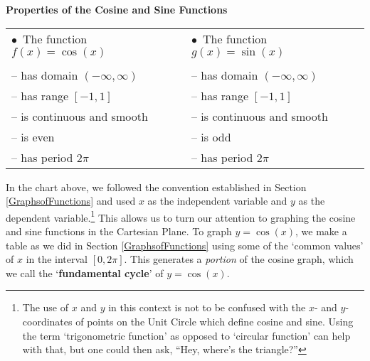 \colorbox{ResultColor}{\bbm

\begin{thm} \label{cosinesinefunctionprops}  \textbf{Properties of the Cosine and Sine Functions}  

\vspace{.2in}

\begin{tabular}{ll}

\hspace{.3in} $\bullet \, $ The function $f(x) = \cos(x)$ & \hspace{.8in} $\bullet \, $ The function $g(x) = \sin(x)$ \\
  & \\

\hspace{.5in} -- has domain $(-\infty, \infty)$ & \hspace{1in} -- has domain $(-\infty, \infty)$ \\ [4pt]
\hspace{.5in} -- has range $[-1,1]$ & \hspace{1in} -- has range $[-1,1]$ \\ [4pt]
\hspace{.5in} -- is continuous and smooth & \hspace{1in} -- is continuous and smooth \\ [4pt]
\hspace{.5in} -- is even & \hspace{1in} -- is odd \\ [4pt]
\hspace{.5in} -- has period $2\pi$ & \hspace{1in} -- has period $2\pi$ \\ 

\end{tabular}

\end{thm}

\ebm}

\medskip

In the chart above, we followed the convention established in Section \ref{GraphsofFunctions} and used $x$ as the independent variable and $y$ as the dependent variable.\footnote{The use of $x$ and $y$ in this context is not to be confused with the $x$- and $y$-coordinates of points on the Unit Circle which define cosine and sine.  Using the term `trigonometric function' as opposed to `circular function' can help with that, but one could then ask, ``Hey, where's the triangle?''}  This allows us to turn our attention to graphing the cosine and sine functions in the Cartesian Plane.  To graph $y = \cos(x)$, we make a table as we did in Section \ref{GraphsofFunctions} using some of the `common values' of $x$ in the interval $[0,2\pi]$. This generates a \textit{portion} of the cosine graph, which we call the `\textbf{fundamental cycle}' of $y = \cos(x)$. 

